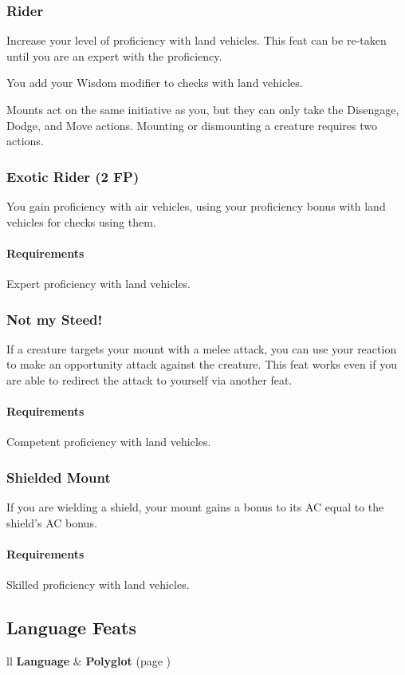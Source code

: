     \subsubsection{Rider} \label{feat::rider}
        Increase your level of proficiency with land vehicles.
        This feat can be re-taken until you are an expert with the proficiency.

        You add your Wisdom modifier to checks with land vehicles.

        Mounts act on the same initiative as you, but they can only take the Disengage, Dodge, and Move actions.
        Mounting or dismounting a creature requires two actions.
    \subsubsection{Exotic Rider (2 FP)} \label{feat::exoticrider}
        You gain proficiency with air vehicles, using your proficiency bonus with land vehicles for checks using them.
        \paragraph{Requirements} Expert proficiency with land vehicles.
    \subsubsection{Not my Steed!} \label{feat::notmysteed}
        If a creature targets your mount with a melee attack, you can use your reaction to make an opportunity attack against the creature.
        This feat works even if you are able to redirect the attack to yourself via another feat.
        \paragraph{Requirements} Competent proficiency with land vehicles.
    \subsubsection{Shielded Mount} \label{feat::shieldedmount}
        If you are wielding a shield, your mount gains a bonus to its AC equal to the shield's AC bonus.
        \paragraph{Requirements} Skilled proficiency with land vehicles.
\subsection*{Language Feats}
    \begin{DndTable}[width=\linewidth, header=Language Feats]{ll}
        \textbf{Language} & \textbf{Polyglot} (page \pageref{feat::polyglot})
    \end{DndTable}

